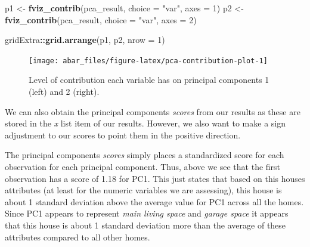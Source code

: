 \documentclass[]{book}
\newenvironment{Shaded}{\begin{snugshade}}{\end{snugshade}}
\newcommand{\CommentTok}[1]{\textcolor[rgb]{0.56,0.35,0.01}{\textit{#1}}}
\newcommand{\DataTypeTok}[1]{\textcolor[rgb]{0.13,0.29,0.53}{#1}}
\newcommand{\DecValTok}[1]{\textcolor[rgb]{0.00,0.00,0.81}{#1}}
\newcommand{\KeywordTok}[1]{\textcolor[rgb]{0.13,0.29,0.53}{\textbf{#1}}}
\newcommand{\NormalTok}[1]{#1}
\newcommand{\OperatorTok}[1]{\textcolor[rgb]{0.81,0.36,0.00}{\textbf{#1}}}
\newcommand{\StringTok}[1]{\textcolor[rgb]{0.31,0.60,0.02}{#1}}
\theoremstyle{definition}
\theoremstyle{definition}
\theoremstyle{definition}
\theoremstyle{remark}
\begin{document}
\begin{Shaded}
\begin{Highlighting}[]
\NormalTok{p1 <-}\StringTok{ }\KeywordTok{fviz_contrib}\NormalTok{(pca_result, }\DataTypeTok{choice =} \StringTok{"var"}\NormalTok{, }\DataTypeTok{axes =} \DecValTok{1}\NormalTok{)}
\NormalTok{p2 <-}\StringTok{ }\KeywordTok{fviz_contrib}\NormalTok{(pca_result, }\DataTypeTok{choice =} \StringTok{"var"}\NormalTok{, }\DataTypeTok{axes =} \DecValTok{2}\NormalTok{)}

\NormalTok{gridExtra}\OperatorTok{::}\KeywordTok{grid.arrange}\NormalTok{(p1, p2, }\DataTypeTok{nrow =} \DecValTok{1}\NormalTok{)}
\end{Highlighting}
\end{Shaded}

\begin{figure}

{\centering \texttt{[image: abar\_files/figure-latex/pca-contribution-plot-1]} 

}

\caption{Level of contribution each variable has on principal components 1 (left) and 2 (right).}\label{fig:pca-contribution-plot}
\end{figure}

We can also obtain the principal components \emph{scores} from our
results as these are stored in the \emph{x} list item of our results.
However, we also want to make a sign adjustment to our scores to point
them in the positive direction.

\begin{Shaded}
\end{Shaded}

The principal components \emph{scores} simply places a standardized
score for each observation for each principal component. Thus, above we
see that the first observation has a score of 1.18 for PC1. This just
states that based on this houses attributes (at least for the numeric
variables we are assessing), this house is about 1 standard deviation
above the average value for PC1 across all the homes. Since PC1 appears
to represent \emph{main living space} and \emph{garage space} it appears
that this house is about 1 standard deviation more than the average of
these attributes compared to all other homes.
\end{document}
